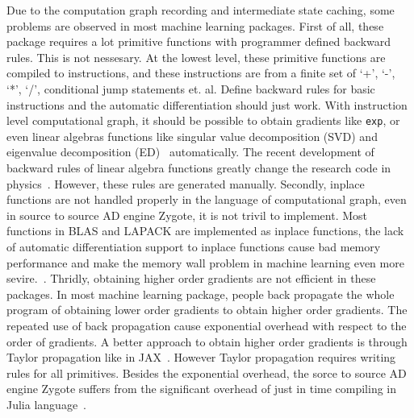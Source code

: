 \documentclass[aps,twocolumn,longbibliography,english,superscriptaddress,prr]{revtex4-1}
\newcommand{\<}{\langle}
\renewcommand{\>}{\rangle}
\theoremstyle{definition}\newtheorem{definition}{\textit{Definition}}
\begin{document}
    Due to the computation graph recording and intermediate state caching, some problems are observed in most machine learning packages. First of all, these package requires a lot primitive functions with programmer defined backward rules. This is not nessesary. At the lowest level, these primitive functions are compiled to instructions, and these instructions are from a finite set of `+', `-', `*', `/', conditional jump statements et. al. Define backward rules for basic instructions and the automatic differentiation should just work. With instruction level computational graph, it should be possible to obtain gradients like \texttt{exp}, or even linear algebras functions like singular value decomposition (SVD) and eigenvalue decomposition (ED)~\cite{Seeger2017,Wan2019,Hubig2019} automatically. The recent development of backward rules of linear algebra functions greatly change the research code in physics~\cite{Xie2020,Liao2019}. However, these rules are generated manually.
    Secondly, inplace functions are not handled properly in the language of computational graph, even in source to source AD engine Zygote, it is not trivil to implement. Most functions in BLAS and LAPACK are implemented as inplace functions, the lack of automatic differentiation support to inplace functions cause bad memory performance and make the memory wall problem in machine learning even more sevire.~\cite{memorywall}.
    Thridly, obtaining higher order gradients are not efficient in these packages. In most machine learning package, people back propagate the whole program of obtaining lower order gradients to obtain higher order gradients. The repeated use of back propagation cause exponential overhead with respect to the order of gradients. A better approach to obtain higher order gradients is through Taylor propagation like in JAX~\cite{Bettencourt2019}. However Taylor propagation requires writing rules for all primitives. Besides the exponential overhead, the sorce to source AD engine Zygote suffers from the significant overhead of just in time compiling in Julia language~\cite{Bezanson2017}.

\end{document}
